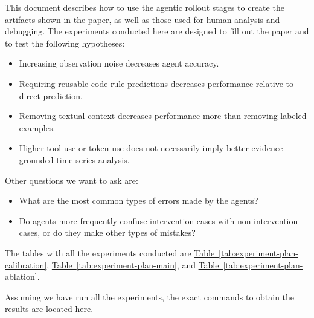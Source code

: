 \documentclass[11pt]{article}
\begin{document}
\providecommand{\FloatBarrier}{}



\newcommand{\calibrationHeader}{%
\textbf{D} & \textbf{Noise} & \textbf{Train} &
\textbf{Test} & \textbf{Row Slug} & \textbf{Mode} \\
}
\newcommand{\experimentHeader}{%
\textbf{D} & \textbf{Noise} & \textbf{Train} &
\textbf{Test} & \textbf{Row Slug} & \textbf{Mode} \\
}
\newcommand{\calibrationRow}[7]{%
\code{#2} & #3 & #4 & #5 & \code{#6} & \code{#7} \\
}
\newcommand{\experimentRow}[7]{%
\code{#2} & #3 & #4 & #5 & \code{#6} & \code{#7} \\
}

\label{docstart:experiment_plan}
This document describes how to use the agentic rollout stages to create the artifacts shown in the paper, as well as those used for human analysis and debugging.
The experiments conducted here are designed to fill out the paper and to test the following hypotheses:
\begin{itemize}
\item Increasing observation noise decreases agent accuracy.
\item Requiring reusable code-rule predictions decreases performance relative to direct prediction.
\item Removing textual context decreases performance more than removing labeled examples.
\item Higher tool use or token use does not necessarily imply better evidence-grounded time-series analysis.
\end{itemize}
Other questions we want to ask are:
\begin{itemize}
  \item What are the most common types of errors made by the agents?
  \item Do agents more frequently confuse intervention cases with non-intervention cases, or do they make other types of mistakes?
\end{itemize}
The tables with all the experiments conducted are  \hyperref[tab:experiment-plan-calibration]{Table~\ref*{tab:experiment-plan-calibration}}, \hyperref[tab:experiment-plan-main]{Table~\ref*{tab:experiment-plan-main}}, and \hyperref[tab:experiment-plan-ablation]{Table~\ref*{tab:experiment-plan-ablation}}.

Assuming we have run all the experiments, the exact commands to obtain the results are located \hyperref[sec:experiment-plan-commands-to-run]{here}.
\end{document}
